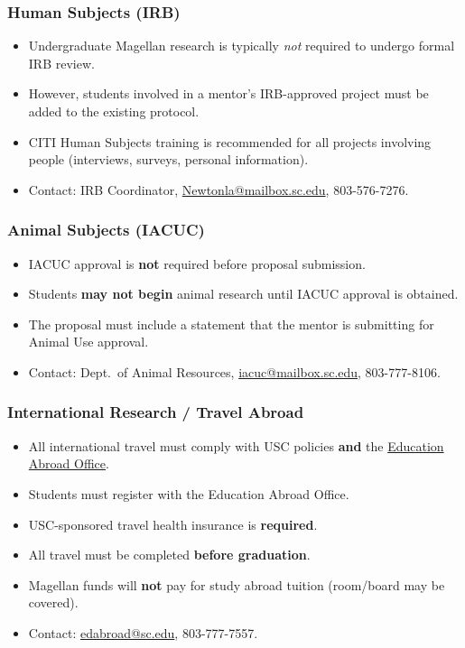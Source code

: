 \documentclass[11pt, letterpaper]{article}
\begin{document}
\subsubsection{Human Subjects (IRB)}
\begin{itemize}[nosep]
    \item Undergraduate Magellan research is typically \emph{not} required to undergo formal IRB review.
    \item However, students involved in a mentor's IRB-approved project must be added to the existing protocol.
    \item CITI Human Subjects training is recommended for all projects involving people (interviews, surveys, personal information).
    \item Contact: IRB Coordinator, \href{mailto:Newtonla@mailbox.sc.edu}{Newtonla@mailbox.sc.edu}, 803-576-7276.
\end{itemize}

\subsubsection{Animal Subjects (IACUC)}
\begin{itemize}[nosep]
    \item IACUC approval is \textbf{not} required before proposal submission.
    \item Students \textbf{may not begin} animal research until IACUC approval is obtained.
    \item The proposal must include a statement that the mentor is submitting for Animal Use approval.
    \item Contact: Dept.\ of Animal Resources, \href{mailto:iacuc@mailbox.sc.edu}{iacuc@mailbox.sc.edu}, 803-777-8106.
\end{itemize}

\subsubsection{International Research / Travel Abroad}
\begin{itemize}[nosep]
    \item All international travel must comply with USC policies \textbf{and} the \href{https://sc.edu/about/offices_and_divisions/education_abroad/}{Education Abroad Office}.
    \item Students must register with the Education Abroad Office.
    \item USC-sponsored travel health insurance is \textbf{required}.
    \item All travel must be completed \textbf{before graduation}.
    \item Magellan funds will \textbf{not} pay for study abroad tuition (room/board may be covered).
    \item Contact: \href{mailto:edabroad@sc.edu}{edabroad@sc.edu}, 803-777-7557.
\end{itemize}
\end{document}
